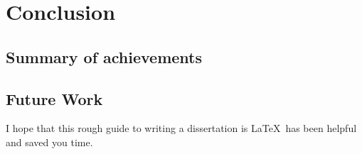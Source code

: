 \documentclass[12pt,a4paper,twoside,openright]{report}
\begin{document}
\chapter{Conclusion}
\section{Summary of achievements}
\section{Future Work}

I hope that this rough guide to writing a dissertation is \LaTeX\ has
been helpful and saved you time.




%
%
%
%
%
%
%
%
%
\end{document}
